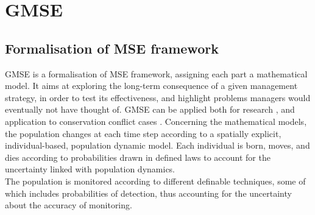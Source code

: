 \documentclass[12pt,a4paper]{article}
\begin{document}
\section{GMSE}%

\subsection{Formalisation of MSE framework}

GMSE is a formalisation of MSE framework, assigning each part a mathematical model. %
It aims at exploring the long-term consequence of a given management strategy, in order to test its effectiveness, and highlight problems managers would eventually not have thought of.
GMSE can be applied both for research \citep{cusack2018time}, and application to conservation conflict cases \citep{bainbridge2017goose}.
Concerning the mathematical models, the population changes at each time step according to a spatially explicit, individual-based, population dynamic model.
Each individual is born, moves, and dies according to probabilities drawn in defined laws to account for the uncertainty linked with population dynamics.\\
The population is monitored according to different definable techniques, some of which includes probabilities of detection, thus accounting for the uncertainty about the accuracy of monitoring.\\ %
\end{document}
